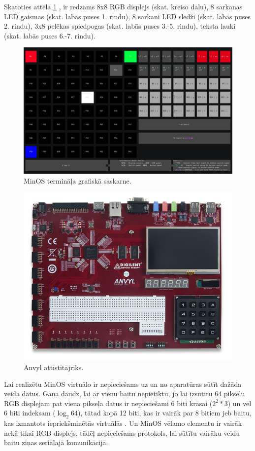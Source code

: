 Skatoties attēla \ref{fig:minosgui} , ir redzams
8x8 RGB displejs (skat. kreiso daļu), 8 sarkanas LED gaismas (skat. labās puses
1. rindu), 8 sarkani LED slēdži (skat. labās puses 2. rindu), 3x8 pelēkas
spiedpogas (skat. labās puses 3.-5. rindu), teksta lauki (skat. labās puses
6.-7. rindu). 

\begin{figure}[H]
    \includegraphics[width=1.0\linewidth]{assets/min-os-execution.png}
    \centering
    \caption{MinOS termināļa grafiskā saskarne.}
    \label{fig:minosgui}
\end{figure}

\begin{figure}[H]
    \includegraphics[width=0.7\linewidth]{assets/anvyl.png}
    \centering
    \caption{Anvyl attīstītājrīks.}
    \label{fig:anvyl}
\end{figure}

Lai realizētu MinOS virtuālo  ir nepieciešams uz
un no aparatūras sūtīt dažāda veida datus. Gana daudz, lai ar vienu baitu
nepietiktu, jo lai izsūtītu 64 pikseļu RGB displejam pat viena pikseļa datus ir
nepieciešami 6 biti krāsai (\(2^2 * 3\)) un vēl 6 biti indeksam
(\(\log_{2}64\)), tātad kopā 12 biti, kas ir vairāk par 8 bitiem jeb baitu, kas
izmantots iepriekšminētās virtuālās . Un MinOS
 vēlamo elementu ir vairāk nekā tikai RGB
displejs, tādēļ nepieciešams protokols, lai sūtītu vairāku veidu baitu ziņas
seriālajā komunikācijā.

